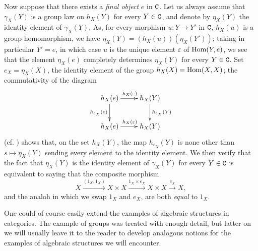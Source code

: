 \begin{env}[8.2.7]
\label{0.8.2.7}
Now suppose that there exists a \emph{final object} $e$  in $\mathtt{C}$.
Let us always assume that $\gamma_X(Y)$ is a group law on $h_X(Y)$ for every $Y\in\mathtt{C}$, and denote by $\eta_X(Y)$ the identity element of $\gamma_X(Y)$.
As, for every morphism $u:Y\to Y'$ in $\mathtt{C}$, $h_X(u)$ is a group homomorphism, we have $\eta_X(Y)=(h_X(u))(\eta_X(Y'))$; taking in particular $Y'=e$, in which case $u$ is the unique element $\varepsilon$ of ${\mathop{\mathrm{Hom}}\nolimits}(Y,e)$, we see that the element $\eta_X(e)$ completely determines $\eta_X(Y)$ for every $Y\in\mathtt{C}$.
Set $e_X=\eta_X(X)$, the identity element of the group $h_X(X)={\mathop{\mathrm{Hom}}\nolimits}(X,X)$; the commutativity of the diagram
\[
  \xymatrix{
    h_X(e)\ar[r]^{h_X(\varepsilon)}\ar[d]_{h_{e_X}(e)} &
    h_X(Y)\ar[d]^{h_{e_X}(Y)}\\
    h_X(e)\ar[r]^{h_X(\varepsilon)} &
    h_X(Y)
  }
\]
(cf. ) shows that, on the set $h_X(Y)$, the map $h_{e_X}(Y)$ is none other than
$s\mapsto\eta_X(Y)$ sending every element to the identity element.
We then verify that the fact that $\eta_X(Y)$ is the identity element of $\gamma_X(Y)$ for every $Y\in\mathtt{C}$ is equivalent to saying that the composite morphism
\[
  X\xrightarrow{(1_X,1_X)}X\times X\xrightarrow{1_X\times e_X}X\times X\xrightarrow{c_X}X,
\]
and the analoh in which we swap $1_X$ and $e_X$, are both \emph{equal} to $1_X$.
\end{env}

\begin{env}[8.2.8]
\label{0.8.2.8}
One could of course easily extend the examples of algebraic structures in categories.
The example of groups was treated with enough detail, but latter on we will usually leave it to the reader to develop analogous notions for the examples of algebraic structures we will encounter.
\end{env}

